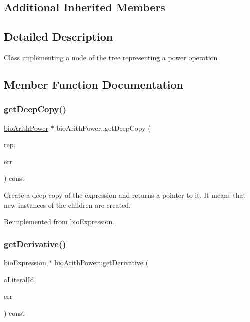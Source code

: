 \subsection*{Additional Inherited Members}


\subsection{Detailed Description}
Class implementing a node of the tree representing a power operation 

\subsection{Member Function Documentation}
\mbox{\label{classbio_arith_power_abad616d9928debfc78b8b8ecd1f0d9bd}} 
\subsubsection{\texorpdfstring{get\+Deep\+Copy()}{getDeepCopy()}}
{\footnotesize\ttfamily \hyperlink{classbio_arith_power}{bio\+Arith\+Power} $\ast$ bio\+Arith\+Power\+::get\+Deep\+Copy (\begin{DoxyParamCaption}\item[{\hyperlink{classbio_expression_repository}{bio\+Expression\+Repository} $\ast$}]{rep,  }\item[{pat\+Error $\ast$\&}]{err }\end{DoxyParamCaption}) const\hspace{0.3cm}{\ttfamily [virtual]}}

Create a deep copy of the expression and returns a pointer to it. It means that new instances of the children are created. 

Reimplemented from \hyperlink{classbio_expression_a4ee1b8add634078a02eaae26cd40dcc8}{bio\+Expression}.

\mbox{\label{classbio_arith_power_accc8e782d664f92db194ef1dc5a19e4b}} 
\subsubsection{\texorpdfstring{get\+Derivative()}{getDerivative()}}
{\footnotesize\ttfamily \hyperlink{classbio_expression}{bio\+Expression} $\ast$ bio\+Arith\+Power\+::get\+Derivative (\begin{DoxyParamCaption}\item[{pat\+U\+Long}]{a\+Literal\+Id,  }\item[{pat\+Error $\ast$\&}]{err }\end{DoxyParamCaption}) const\hspace{0.3cm}{\ttfamily [virtual]}}


